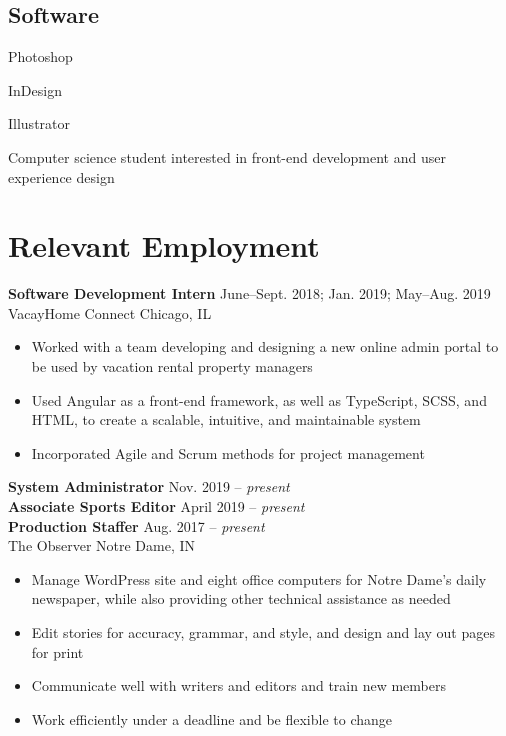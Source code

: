 \documentclass[letterpaper]{article}
\newcommand{\present}[0]{{\itshape present}}
\begin{document}
\begin{minipage}[t]{\dimexpr.33\textwidth-.5\columnsep}
\begin{minipage}[t]{.5\textwidth}
\subsection{Software}
\begin{skillslist}
    \item Photoshop
    \item InDesign
    \item Illustrator
\end{skillslist}

\end{minipage}

\end{minipage}%
\begin{minipage}[t]{\dimexpr.67\textwidth-.5\columnsep}

\begin{center}
    {\Huge\ttfamily\bfseries \uppercase{}}

    {\large\ttfamily Computer science student interested in front-end development and user experience design}
\end{center}

\section{Relevant Employment}

\textbf{Software Development Intern} \hfill June--Sept. 2018; Jan. 2019; May--Aug. 2019 \\
VacayHome Connect \hfill Chicago, IL
\begin{itemize}
    \item Worked with a team developing and designing a new online admin portal to be used by vacation rental property managers
    \item Used Angular as a front-end framework, as well as TypeScript, SCSS, and HTML, to create a scalable, intuitive, and maintainable system
    \item Incorporated Agile and Scrum methods for project management
\end{itemize}

\textbf{System Administrator} \hfill Nov. 2019 -- \present{} \\
\textbf{Associate Sports Editor} \hfill April 2019 -- \present{} \\
\textbf{Production Staffer} \hfill Aug. 2017 -- \present{} \\
The Observer \hfill Notre Dame, IN

\begin{itemize}
    \item Manage WordPress site and eight office computers for Notre Dame’s daily newspaper, while also providing other technical assistance as needed
    \item Edit stories for accuracy, grammar, and style, and design and lay out pages for print
    \item Communicate well with writers and editors and train new members
    \item Work efficiently under a deadline and be flexible to change
\end{itemize}


\end{minipage}
\end{document}
